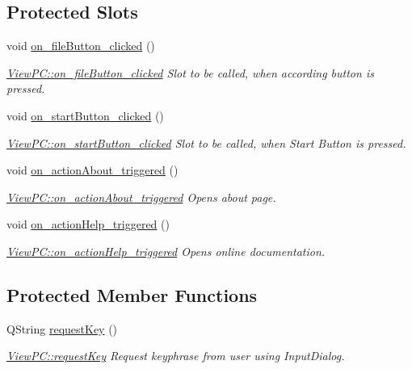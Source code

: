 \subsection*{Protected Slots}
\begin{DoxyCompactItemize}
\item 
void \hyperlink{class_view_p_c_a3b9b7a7be9702d8b160f257f1c74a776}{on\+\_\+file\+Button\+\_\+clicked} ()
\begin{DoxyCompactList}\small\item\em \hyperlink{class_view_p_c_a3b9b7a7be9702d8b160f257f1c74a776}{View\+P\+C\+::on\+\_\+file\+Button\+\_\+clicked} Slot to be called, when according button is pressed. \end{DoxyCompactList}\item 
void \hyperlink{class_view_p_c_a456d75b7c5d3a089302a576e7359f1f4}{on\+\_\+start\+Button\+\_\+clicked} ()
\begin{DoxyCompactList}\small\item\em \hyperlink{class_view_p_c_a456d75b7c5d3a089302a576e7359f1f4}{View\+P\+C\+::on\+\_\+start\+Button\+\_\+clicked} Slot to be called, when Start Button is pressed. \end{DoxyCompactList}\item 
void \hyperlink{class_view_p_c_a09a46da4d492eb3dde88f35dc58c997b}{on\+\_\+action\+About\+\_\+triggered} ()
\begin{DoxyCompactList}\small\item\em \hyperlink{class_view_p_c_a09a46da4d492eb3dde88f35dc58c997b}{View\+P\+C\+::on\+\_\+action\+About\+\_\+triggered} Opens about page. \end{DoxyCompactList}\item 
void \hyperlink{class_view_p_c_a0d252ff4829260c6c76769fbd24b7cd7}{on\+\_\+action\+Help\+\_\+triggered} ()
\begin{DoxyCompactList}\small\item\em \hyperlink{class_view_p_c_a0d252ff4829260c6c76769fbd24b7cd7}{View\+P\+C\+::on\+\_\+action\+Help\+\_\+triggered} Opens online documentation. \end{DoxyCompactList}\end{DoxyCompactItemize}
\subsection*{Protected Member Functions}
\begin{DoxyCompactItemize}
\item 
Q\+String \hyperlink{class_view_p_c_a559c95675ec98b15451f3bca47033d9c}{request\+Key} ()
\begin{DoxyCompactList}\small\item\em \hyperlink{class_view_p_c_a559c95675ec98b15451f3bca47033d9c}{View\+P\+C\+::request\+Key} Request keyphrase from user using Input\+Dialog. \end{DoxyCompactList}\end{DoxyCompactItemize}


